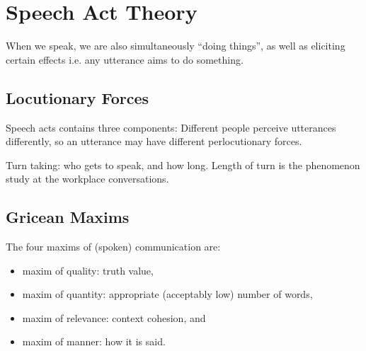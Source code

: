 \documentclass[../main.tex]{subfiles}
\begin{document}
    \chapter{Speech Act Theory}

    \begin{preamb}
        When we speak, we are also simultaneously ``doing things'', as well as eliciting certain effects i.e. any utterance aims to do something.
    \end{preamb}

    \section{Locutionary Forces}
    Speech acts contains three components: 
    Different people perceive utterances differently, so an utterance may have different perlocutionary forces.


    Turn taking: who gets to speak, and how long. Length of turn is the phenomenon study at the workplace conversations.

	\section{Gricean Maxims}
	The four maxims of (spoken) communication are: \begin{itemize}
			\item maxim of quality: truth value,
			\item maxim of quantity: appropriate (acceptably low) number of words,
			\item maxim of relevance: context cohesion, and
			\item maxim of manner: how it is said.
	\end{itemize}
\end{document}
